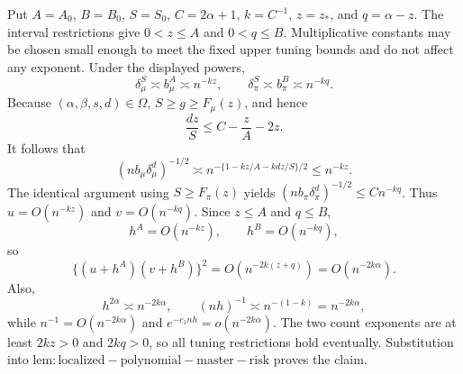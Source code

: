 Put \(A=A_0\), \(B=B_0\), \(S=S_0\), \(C=2\alpha+1\), \(k=C^{-1}\), \(z=z_*\), and \(q=\alpha-z\).  The interval restrictions give \(0<z\le A\) and \(0<q\le B\).  Multiplicative constants may be chosen small enough to meet the fixed upper tuning bounds and do not affect any exponent.  Under the displayed powers,
\[
\delta_\mu^S\asymp b_\mu^A\asymp n^{-kz},
\qquad
\delta_\pi^S\asymp b_\pi^B\asymp n^{-kq}.
\]
Because \((\alpha,\beta,s,d)\in\Omega\), \(S\ge g\ge F_\mu(z)\), and hence
\[
\frac{dz}{S}\le C-\frac zA-2z.
\]
It follows that
\[
(nb_\mu\delta_\mu^d)^{-1/2}
\asymp n^{-\{1-kz/A-kdz/S\}/2}
\le n^{-kz}.
\]
The identical argument using \(S\ge F_\pi(z)\) yields \((nb_\pi\delta_\pi^d)^{-1/2}\le Cn^{-kq}\).  Thus \(u=O(n^{-kz})\) and \(v=O(n^{-kq})\).  Since \(z\le A\) and \(q\le B\),
\[
h^A=O(n^{-kz}),
\qquad
h^B=O(n^{-kq}),
\]
so
\[
\{(u+h^A)(v+h^B)\}^2=O(n^{-2k(z+q)})=O(n^{-2k\alpha}).
\]
Also,
\[
h^{2\alpha}\asymp n^{-2k\alpha},
\qquad
(nh)^{-1}\asymp n^{-(1-k)}=n^{-2k\alpha},
\]
while \(n^{-1}=O(n^{-2k\alpha})\) and \(e^{-c_1nh}=o(n^{-2k\alpha})\).  The two count exponents are at least \(2kz>0\) and \(2kq>0\), so all tuning restrictions hold eventually.  Substitution into \(\mathrm{lem:localized-polynomial-master-risk}\) proves the claim.